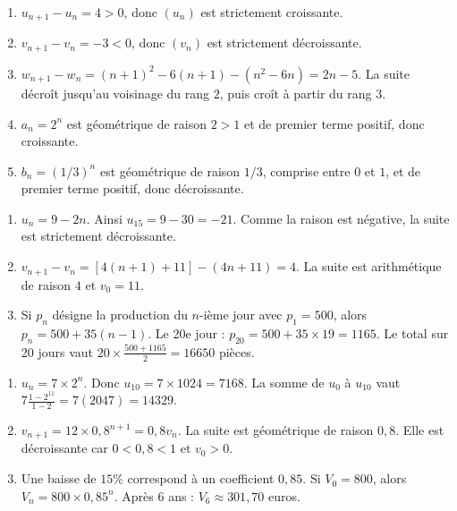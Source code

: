 \documentclass[11pt,a4paper]{article}
\begin{document}
\begin{correctionbox}
\begin{enumerate}[label=\alph*)]
  \item $u_{n+1}-u_n=4>0$, donc $(u_n)$ est strictement croissante.
  \item $v_{n+1}-v_n=-3<0$, donc $(v_n)$ est strictement décroissante.
  \item $w_{n+1}-w_n=(n+1)^2-6(n+1)-(n^2-6n)=2n-5$. La suite décroît jusqu'au voisinage du rang $2$, puis croît à partir du rang $3$.
  \item $a_n=2^n$ est géométrique de raison $2>1$ et de premier terme positif, donc croissante.
  \item $b_n=(1/3)^n$ est géométrique de raison $1/3$, comprise entre $0$ et $1$, et de premier terme positif, donc décroissante.
\end{enumerate}
\end{correctionbox}

\begin{correctionbox}
\begin{enumerate}
  \item $u_n=9-2n$. Ainsi $u_{15}=9-30=-21$. Comme la raison est négative, la suite est strictement décroissante.
  \item $v_{n+1}-v_n=[4(n+1)+11]-(4n+11)=4$. La suite est arithmétique de raison $4$ et $v_0=11$.
  \item Si $p_n$ désigne la production du $n$-ième jour avec $p_1=500$, alors $p_n=500+35(n-1)$. Le 20e jour : $p_{20}=500+35\times19=1165$. Le total sur 20 jours vaut $20\times\frac{500+1165}{2}=16650$ pièces.
\end{enumerate}
\end{correctionbox}

\begin{correctionbox}
\begin{enumerate}
  \item $u_n=7\times2^n$. Donc $u_{10}=7\times1024=7168$. La somme de $u_0$ à $u_{10}$ vaut $7\frac{1-2^{11}}{1-2}=7(2047)=14329$.
  \item $v_{n+1}=12\times0{,}8^{n+1}=0{,}8v_n$. La suite est géométrique de raison $0{,}8$. Elle est décroissante car $0<0{,}8<1$ et $v_0>0$.
  \item Une baisse de $15\%$ correspond à un coefficient $0{,}85$. Si $V_0=800$, alors $V_n=800\times0{,}85^n$. Après $6$ ans : $V_6\approx301{,}70$ euros.
\end{enumerate}
\end{correctionbox}
\end{document}
